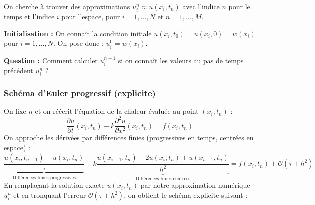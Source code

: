 \begin{center}
\end{center}

On cherche à trouver des approximations $u_i^n \approx u(x_i, t_n)$ avec l'indice $n$ pour le temps et l'indice $i$ pour l'espace, pour $i=1,\dots,N$ et $n=1,\dots,M$.

\textbf{Initialisation :}
On connaît la condition initiale $u(x_i, t_0) = u(x_i, 0) = w(x_i)$ pour $i=1,\dots,N$.
On pose donc : $u_i^0 = w(x_i)$.

\textbf{Question :} Comment calculer $u_i^{n+1}$ si on connaît les valeurs au pas de temps précédent $u_i^n$ ?

\subsubsection{Schéma d'Euler progressif (explicite)}

On fixe $n$ et on réécrit l'équation de la chaleur évaluée au point $(x_i, t_n)$ :
\[
    \frac{\partial u}{\partial t}(x_i,t_n) - k \frac{\partial^2 u}{\partial x^2}(x_i,t_n) = f(x_i,t_n)
\]
On approche les dérivées par différences finies (progressives en temps, centrées en espace) :
\[
    \underbrace{\frac{u(x_i, t_{n+1}) - u(x_i, t_n)}{\tau}}_{\text{Différences finies progressives}} - k \underbrace{\frac{u(x_{i+1}, t_n) - 2u(x_i, t_n) + u(x_{i-1}, t_n)}{h^2}}_{\text{Différences finies centrées}} = f(x_i, t_n) + \mathcal{O}(\tau + h^2)
\]
En remplaçant la solution exacte $u(x_i, t_n)$ par notre approximation numérique $u_i^n$ et en tronquant l'erreur $\mathcal{O}(\tau + h^2)$, on obtient le schéma explicite suivant :

